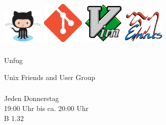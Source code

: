 \begin{frame}
\begin{center}
        \includegraphics[width=0.15\textwidth]{img/github.png}
        \includegraphics[width=0.15\textwidth]{img/git.png}
        \includegraphics[width=0.15\textwidth]{img/vim.png}
        \includegraphics[width=0.15\textwidth]{img/emacs.png}

    \end{center}

\end{frame}


\begin{frame}
    \frametitle{}

    \begin{center}
        \huge{Unfug}

        Unix Friends and User Group
    \end{center}

\end{frame}


\begin{frame}
    \frametitle{}

    \begin{center}
        {\huge
            Jeden Donnerstag
            \\

            19:00 Uhr bis ca. 20:00 Uhr
            \\

            B 1.32
        \par}
    \end{center}

\end{frame}


